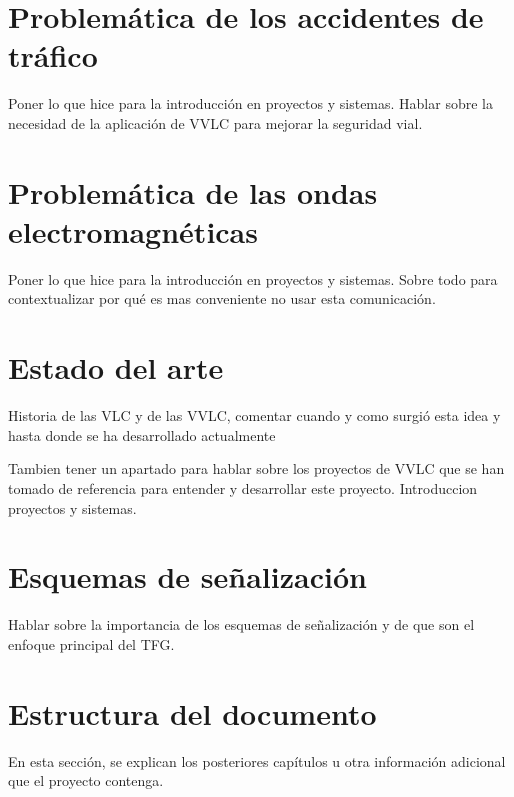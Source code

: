 
\minitoc

\section{Problemática de los accidentes de tráfico}
Poner lo que hice para la introducción en proyectos y sistemas. Hablar sobre la necesidad de la aplicación de VVLC para mejorar la seguridad vial.

\section{Problemática de las ondas electromagnéticas}
Poner lo que hice para la introducción en proyectos y sistemas. Sobre todo para contextualizar por qué es mas conveniente no usar esta comunicación.

\section{Estado del arte}

Historia de las VLC y de las VVLC, comentar cuando y como surgió esta idea y hasta donde se ha desarrollado actualmente

Tambien tener un apartado para hablar sobre los proyectos de VVLC que se han tomado de referencia para entender y desarrollar este proyecto. Introduccion proyectos y sistemas. 

\section{Esquemas de señalización}

Hablar sobre la importancia de los esquemas de señalización y de que son el enfoque principal del TFG.

\section{Estructura del documento}

En esta sección, se explican los posteriores capítulos u otra información adicional que el proyecto contenga.

